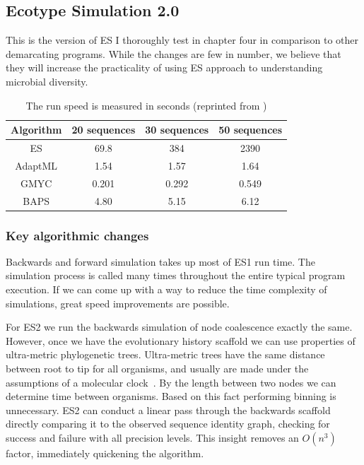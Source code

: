 \subsection*{Ecotype Simulation 2.0}
This is the version of ES I thoroughly test in chapter four in comparison to other demarcating programs.
While the changes are few in number, we believe that they will increase the practicality of using ES approach to understanding microbial diversity.

\begin{table}
 \begin{tabular}{| c | c | c | c |}
  \hline
  Algorithm & 20 sequences & 30 sequences & 50 sequences \\ \hline
  ES & 69.8 & 384 & 2390 \\
  AdaptML & 1.54 & 1.57 & 1.64 \\
  GMYC & 0.201 & 0.292 & 0.549 \\
  BAPS & 4.80 & 5.15 & 6.12 \\
  \hline
 \end{tabular}
 \caption[ES1 run-time compared to other demarcation programs.]{The run speed is measured in seconds (reprinted from \protect\cite{carlo})}
 \label{tab:ES1speed}
\end{table}

\subsubsection*{Key algorithmic changes}
Backwards and forward simulation takes up most of ES1 run time.
The simulation process is called many times throughout the entire typical program execution.
If we can come up with a way to reduce the time complexity of simulations, great speed improvements are possible.

For ES2 we run the backwards simulation of node coalescence exactly the same.
However, once we have the evolutionary history scaffold we can use properties of ultra-metric phylogenetic trees.
Ultra-metric trees have the same distance between root to tip for all organisms, and usually are made under the assumptions of a molecular clock~\cite{ho2008molecular}.
By the length between two nodes we can determine time between organisms.
Based on this fact performing binning is unnecessary.
ES2 can conduct a linear pass through the backwards scaffold directly comparing it to the observed sequence identity graph, checking for success and failure with all precision levels.
This insight removes an $O(n^3)$ factor, immediately quickening the algorithm.

